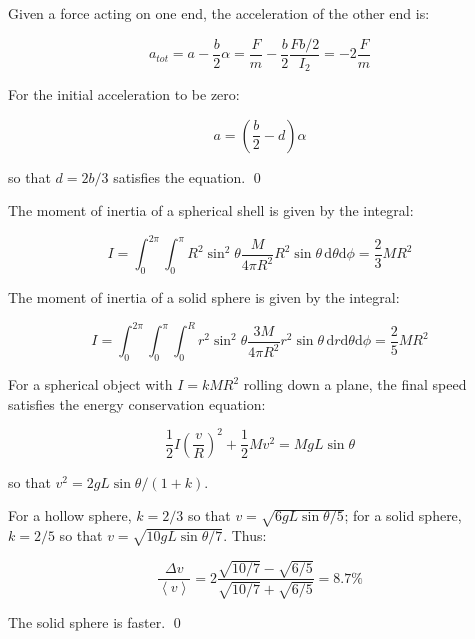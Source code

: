 \documentclass[12pt]{article}
\begin{document}
Given a force acting on one end, the acceleration of the other end is:

\begin{equation}
    a_{tot} = a - \frac{b}{2} \alpha = \frac{F}{m} - \frac{b}{2} \frac{F b/2}{I_{2}} = -2\frac{F}{m}
\end{equation}

For the initial acceleration to be zero:

\begin{equation}
    a = (\frac{b}{2} - d) \alpha
\end{equation}

so that $d = 2b/3$ satisfies the equation.
\qed


The moment of inertia of a spherical shell is given by the integral:

\begin{equation}
    I = \int_{0}^{2\pi} \int_{0}^{\pi} R^{2} \sin^{2}{\theta} \frac{M}{4\pi R^{2}} R^{2} \sin{\theta} \, \mathrm{d}\theta \mathrm{d}\phi = \frac{2}{3} MR^{2}
\end{equation}

The moment of inertia of a solid sphere is given by the integral:

\begin{equation}
    I = \int_{0}^{2\pi} \int_{0}^{\pi} \int_{0}^{R} r^{2} \sin^{2}{\theta} \frac{3M}{4\pi R^{2}} r^2 \sin{\theta} \, \mathrm{d}r \mathrm{d}\theta \mathrm{d}\phi = \frac{2}{5} MR^{2}
\end{equation}

For a spherical object with $I = kMR^{2}$ rolling down a plane, the final speed satisfies the energy conservation equation:

\begin{equation}
    \frac{1}{2} I \left( \frac{v}{R} \right)^2 + \frac{1}{2} M v^{2} = MgL \sin{\theta}
\end{equation}

so that $v^{2} = 2gL \sin{\theta}/(1+k)$.

For a hollow sphere, $k = 2/3$ so that $v = \sqrt{6gL \sin{\theta}/5}$; for a solid sphere, $k = 2/5$ so that $v = \sqrt{10gL \sin{\theta}/7}$. Thus:

\begin{equation}
    \frac{\Delta v}{\left\langle v \right\rangle} = 2\frac{\sqrt{10/7} - \sqrt{6/5}}{\sqrt{10/7} + \sqrt{6/5}} = 8.7\%
\end{equation}

The solid sphere is faster.
\qed
\end{document}
